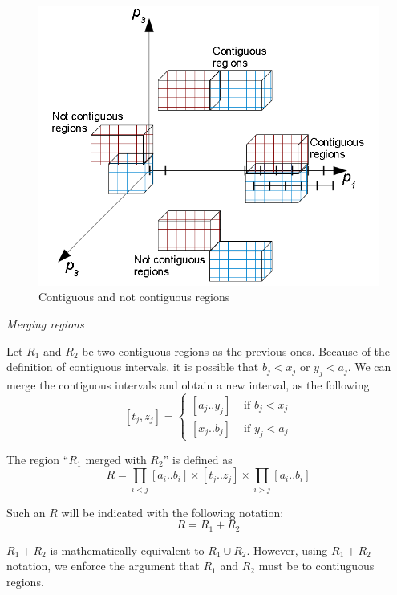 \begin{figure}[h]
\includegraphics[width=0.9\columnwidth]{img/contiguous_regions}

\caption{\label{pers02.fig:Contiguous-regions}Contiguous and not contiguous
regions}
\end{figure}



\begin{defn}
\emph{\label{pers02.def:Merging-regions}Merging regions}

Let $R_{1}$ and $R_{2}$ be two contiguous regions as the previous
ones. Because of the definition of contiguous intervals, it is possible
that $b_{j}<x_{j}$ or $y_{j}<a_{j}$. We can merge the contiguous
intervals and obtain a new interval, as the following
\[
\left[t_{j},z_{j}\right]=\begin{cases}
\left[a_{j}..y_{j}\right] & \mbox{ if }b_{j}<x_{j}\\
\left[x_{j}..b_{j}\right] & \mbox{ if }y_{j}<a_{j}
\end{cases}
\]


The region ``$R_{1}$ merged with $R_{2}$'' is defined as
\[
R=\prod_{i<j}\left[a_{i}..b_{i}\right]\times\left[t_{j}..z_{j}\right]\times\prod_{i>j}\left[a_{i}..b_{i}\right]
\]


Such an $R$ will be indicated with the following notation:
\[
R=R_{1}+R_{2}
\]
\end{defn}
\begin{rem}
$R_{1}+R_{2}$ is mathematically equivalent to $R_{1}\cup R_{2}$.
However, using $R_{1}+R_{2}$ notation, we enforce the argument that
$R_{1}$ and $R_{2}$ must be to contiuguous regions.
\end{rem}


